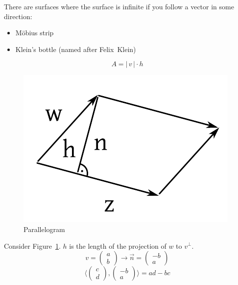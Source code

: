 \documentclass[a4paper,landscape,twocolumn]{article}
\newcommand\abs[1]{|\,#1\,|}
\begin{document}
There are surfaces where the surface is infinite if you follow a vector in some direction:
\begin{itemize}
  \item Möbius strip
  \item Klein's bottle (named after Felix~Klein)
\end{itemize}

\[ A = \abs{v} \cdot h \]

\begin{figure}[!h]
  \begin{center}
    \includegraphics{img/parallelogram.pdf}
    \caption{Parallelogram}
    \label{img:para}
  \end{center}
\end{figure}

Consider Figure~\ref{img:para}.
$h$ is the length of the projection of $w$ to $v^\bot$.
\[
  v = \begin{pmatrix} a \\ b \end{pmatrix}
  \to
  \vec{n} = \begin{pmatrix} -b \\ a \end{pmatrix}
\] \[
  \langle \begin{pmatrix} c \\ d \end{pmatrix}, \begin{pmatrix} -b \\ a \end{pmatrix} \rangle
  = ad - bc
\]
\end{document}
